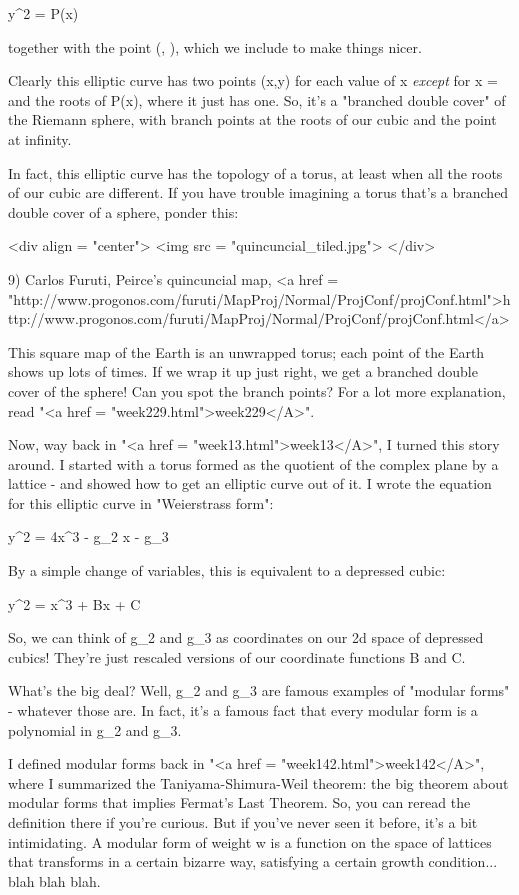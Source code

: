 y^{2} = P(x)

together with the point (\infty , \infty ), which we include to
make things nicer.

Clearly this elliptic curve has two points (x,y) for each value of x
\emph{except} for x = \infty  and the roots of P(x), where it just has one.
So, it's a "branched double cover" of the Riemann sphere,
with branch points at the roots of our cubic and the point at infinity.

In fact, this elliptic curve has the topology of a torus, at least 
when all the roots of our cubic are different.  If you have trouble
imagining a torus that's a branched double cover of a sphere, ponder
this:

<div align = "center">
<img src = "quincuncial_tiled.jpg">
</div>

9) Carlos Furuti, Peirce's quincuncial map, 
<a href = "http://www.progonos.com/furuti/MapProj/Normal/ProjConf/projConf.html">http://www.progonos.com/furuti/MapProj/Normal/ProjConf/projConf.html</a>

This square map of the Earth is an unwrapped torus; each point of the
Earth shows up lots of times.  If we wrap it up just right, we get a
branched double cover of the sphere!  Can you spot the branch points?
For a lot more explanation, read "<a href =
"week229.html">week229</A>".

Now, way back in "<a href = "week13.html">week13</A>", I turned this story around.  I started with 
a torus formed as the quotient of the complex plane by a lattice -
and showed how to get an elliptic curve out of it.  I wrote the 
equation for this elliptic curve in "Weierstrass form":

y^{2} = 4x^{3} - g_{2} x - g_{3}

By a simple change of variables, this is equivalent to a depressed 
cubic:

y^{2} = x^{3} + Bx + C

So, we can think of g_{2} and g_{3} as coordinates on
our 2d space of depressed cubics!  They're just rescaled versions of
our coordinate functions B and C.

What's the big deal?  Well, g_{2} and g_{3} are famous
examples of "modular forms" - whatever those are.  In fact,
it's a famous fact that every modular form is a polynomial in
g_{2} and g_{3}.

I defined modular forms back in "<a href = "week142.html">week142</A>", where I summarized the
Taniyama-Shimura-Weil theorem: the big theorem about modular forms
that implies Fermat's Last Theorem.  So, you can reread the definition
there if you're curious.  But if you've never seen it before, it's
a bit intimidating.  A modular form of weight w is a function on the 
space of lattices that transforms in a certain bizarre way, satisfying a 
certain growth condition... blah blah blah.

